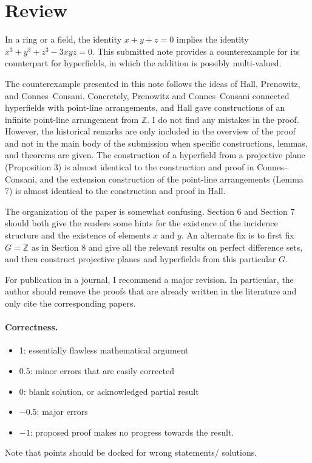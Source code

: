 \documentclass[11pt]{article}
\theoremstyle{definition}
\theoremstyle{remark}
\begin{document}
\maketitle

\section{Review}

In a ring or a field, the identity $x+y+z = 0$ implies the identity $x^3 + y^3 + z^3 - 3xyz = 0$. This submitted note provides a counterexample for its counterpart for hyperfields, in which the addition is possibly multi-valued. 

The counterexample presented in this note follows the ideas of Hall, Prenowitz, and Connes--Consani. Concretely, Prenowitz and Connes--Consani connected hyperfields with point-line arrangements, and Hall gave constructions of an infinite point-line arrangement from $\mathbb{Z}$. I do not find any mistakes in the proof. However, the historical remarks are only included in the overview of the proof and not in the main body of the submission when specific constructions, lemmas, and theorems are given. The construction of a hyperfield from a projective plane (Proposition 3) is almost identical to the construction and proof in Connes--Consani, and the extension construction of the point-line arrangements (Lemma 7) is almost identical to the construction and proof in Hall. 

The organization of the paper is somewhat confusing. Section 6 and Section 7 should both give the readers some hints for the existence of the incidence structure and the existence of elements $x$ and $y$. An alternate fix is to first fix $G = \mathbb{Z}$ as in Section 8 and give all the relevant results on perfect difference sets, and then construct projective planes and hyperfields from this particular $G$. 

For publication in a journal, I recommend a major revision. In particular, the author should remove the proofs that are already written in the literature and only cite the corresponding papers. 


\paragraph{Correctness.}
\begin{itemize}
	\item  1: essentially flawless mathematical argument
	\item  0.5: minor errors that are easily corrected
	\item  0: blank solution, or acknowledged partial result
	\item  $-0.5$: major errors
	\item  $-1$: proposed proof makes no progress towards the result.
\end{itemize}
Note that points should be docked for wrong statements/ solutions.
\end{document}

